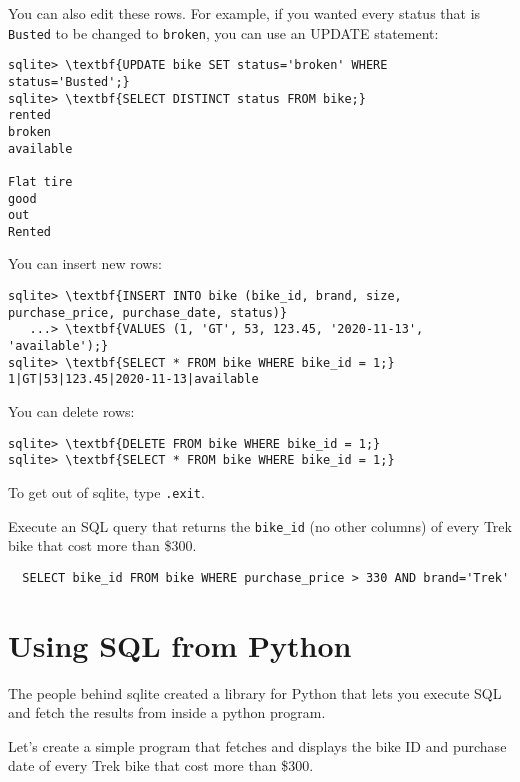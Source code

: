 You can also edit these rows.  For example, if you wanted every status
that is \texttt{Busted} to be changed to \texttt{broken}, you can use an UPDATE statement:

\begin{Verbatim}[commandchars=\\\{\}]
sqlite> \textbf{UPDATE bike SET status='broken' WHERE status='Busted';}
sqlite> \textbf{SELECT DISTINCT status FROM bike;}
rented
broken
available

Flat tire
good
out
Rented
\end{Verbatim}

You can insert new rows:
\begin{Verbatim}[commandchars=\\\{\}]
sqlite> \textbf{INSERT INTO bike (bike_id, brand, size, purchase_price, purchase_date, status)}
   ...> \textbf{VALUES (1, 'GT', 53, 123.45, '2020-11-13', 'available');}
sqlite> \textbf{SELECT * FROM bike WHERE bike_id = 1;}
1|GT|53|123.45|2020-11-13|available
\end{Verbatim}

You can delete rows:
\begin{Verbatim}[commandchars=\\\{\}]
sqlite> \textbf{DELETE FROM bike WHERE bike_id = 1;}
sqlite> \textbf{SELECT * FROM bike WHERE bike_id = 1;}
\end{Verbatim}

To get out of sqlite, type \texttt{.exit}.

\begin{Exercise}[title={SQL Query}, label=sql_where]
  Execute an SQL query that returns the \texttt{bike\_id} (no other
  columns) of every Trek bike that cost more than \$300.
\end{Exercise}
\begin{Answer}[ref=sql_where]
\begin{Verbatim}
  SELECT bike_id FROM bike WHERE purchase_price > 330 AND brand='Trek'
\end{Verbatim}
\end{Answer}

\section{Using SQL from Python}

The people behind sqlite created a library for Python that lets you
execute SQL and fetch the results from inside a python program.

Let's create a simple program that fetches and displays the bike ID
and purchase date of every Trek bike that cost more than \$300.

